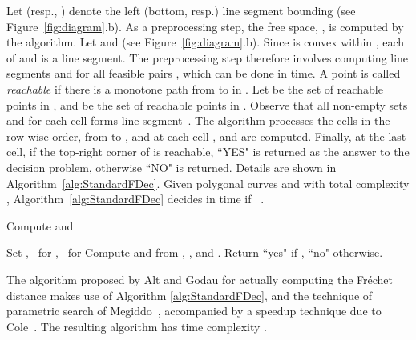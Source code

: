 \documentclass[12pt]{dalthesis}
\newcommand{\Frechet}{Fr\'echet }
\begin{document}
Let  (resp., ) denote the left (bottom, resp.) line 
segment bounding  (see Figure~\ref{fig:diagram}.b).
As a preprocessing step, the free space, , is computed by the algorithm.
Let  and  
(see Figure~\ref{fig:diagram}.b).
Since  is convex within ,
each of  and  is a line segment. 
The preprocessing step therefore involves computing line segments
 and  for all feasible pairs , which can be done in  time.
A point  is called {\em reachable\/} 
if there is a monotone path from  to  in .
Let  be the set of reachable points in ,
and  be the set of reachable points in .
Observe that all non-empty sets  and  for each cell  forms line 
segment~\cite{AltG95}. The algorithm processes the cells in the row-wise order, from  to , 
and at each cell ,  and  are computed. 
Finally, at the last cell, if the top-right corner of  is reachable, 
``YES" is returned as the answer to the decision problem, otherwise ``NO" is returned.
Details are shown in Algorithm~\ref{alg:StandardFDec}. 
Given polygonal curves  and  with total complexity , 
Algorithm~\ref{alg:StandardFDec} decides in  time 
if ~\cite{AltG95}.






\begin{algorithm} [h]
\caption {\sc Standard \Frechet Decision Algorithm~\cite{AltG95} } \label{alg:StandardFDec}




\begin{algorithmic}[1]
	\vspace{0.5em}
	\baselineskip

 
 		\STATE Compute   and 
\ENDFOR

	\STATE Set , \ 
		 for , \ 
		 for   
			\STATE Compute   and  from  , ,   and .
		\ENDFOR
	\ENDFOR
	\STATE\label{line:last} Return ``{\sc yes}" if , ``{\sc no}" otherwise. 

\end{algorithmic}
\end{algorithm}






The algorithm proposed by Alt and Godau for actually computing the \Frechet distance  
makes use of Algorithm \ref{alg:StandardFDec}, and the technique of parametric search of Megiddo~\cite{Megiddo83}, 
accompanied by a speedup technique due to Cole~\cite{Cole87}. 
The resulting algorithm has time complexity .
\end{document}
